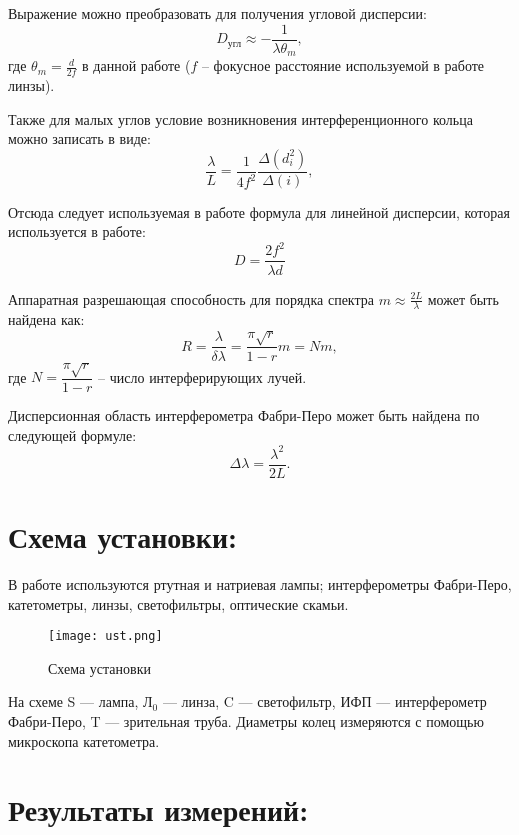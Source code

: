 \documentclass[a4paper, 12pt]{article}
\begin{document}
Выражение можно преобразовать для получения угловой дисперсии:
\begin{equation}
    D_{\text{угл}} \approx -\frac{1}{\lambda \theta_{m}},
\end{equation}
где $\theta_{m} = \frac{d}{2f}$ в данной работе ($f$ -- фокусное расстояние используемой в работе линзы).

Также для малых углов условие возникновения  интерференционного кольца можно записать в виде:
\begin{equation}
    \frac{\lambda}{L} = \frac{1}{4f^2}\frac{\Delta(d^2_i)}{\Delta(i)},
\end{equation}

Отсюда следует используемая в работе формула для линейной дисперсии, которая используется в работе:
\begin{equation}
    D = \frac{2f^{2}}{\lambda d}
\end{equation}

Аппаратная разрешающая способность для порядка спектра $m \approx \frac{2L}{\lambda}$ может быть найдена как:
\begin{equation}
    R = \frac{\lambda}{\delta \lambda} = \frac{\pi \sqrt{r}}{1 - r}m = Nm,
\end{equation}
где $N = \dfrac{\pi \sqrt{r}}{1 - r}$ -- число интерферирующих лучей.

Дисперсионная область интерферометра Фабри-Перо может быть найдена по следующей формуле:
\begin{equation}
    \Delta \lambda = \frac{\lambda^{2}}{2L}.
\end{equation}

\large\section{Схема установки:}
В работе используются ртутная и натриевая лампы; интерферометры Фабри-Перо,
катетометры, линзы, светофильтры, оптические скамьи.
\begin{figure}[htbp]
\centerline{\texttt{[image: ust.png]}}
\caption[]{\label{fig:scheme} Схема установки}
\end{figure}

На схеме S --- лампа, $\text{Л}_{0}$ --- линза, C --- светофильтр, ИФП --- интерферометр
Фабри-Перо, T --- зрительная труба. Диаметры колец измеряются с помощью микроскопа
катетометра.

\large\section{Результаты измерений:}
\end{document}
